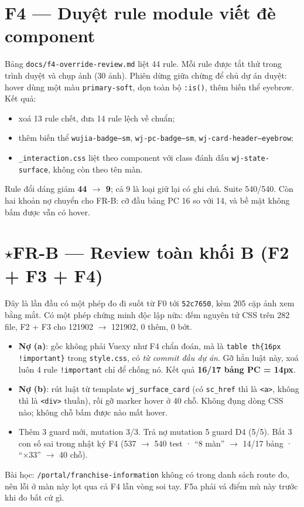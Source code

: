 \section{F4 --- Duyệt rule module viết đè component}

Bảng \texttt{docs/f4-override-review.md} liệt 44 rule. Mỗi rule được tắt thử trong trình duyệt và chụp
ảnh (30 ảnh). Phiên dừng giữa chừng để chủ dự án duyệt: hover dùng một màu \texttt{primary-soft}, dọn toàn
bộ \texttt{:is()}, thêm biến thể eyebrow. Kết quả:
\begin{itemize}[nosep]
\item xoá 13 rule chết, đưa 14 rule lệch về chuẩn;
\item thêm biến thể \texttt{wujia-badge--sm}, \texttt{wj-pc-badge--sm}, \texttt{wj-card-header--eyebrow};
\item \texttt{\_interaction.css} liệt theo component với class đánh dấu \texttt{wj-state-surface}, không còn theo tên màn.
\end{itemize}
Rule đổi dáng giảm \textbf{44 $\to$ 9}; cả 9 là loại giữ lại có ghi chú. Suite 540/540. Còn hai khoản nợ chuyển
cho FR-B: cỡ đầu bảng PC 16 so với 14, và bề mặt không bấm được vẫn có hover.

\section{$\star$FR-B --- Review toàn khối B (F2 + F3 + F4)}

Đây là lần đầu có một phép đo đi suốt từ F0 tới \texttt{52c7650}, kèm 205 cặp ảnh xem bằng mắt. Có một
phép chứng minh độc lập nữa: đếm nguyên tử CSS trên 282 file, F2 + F3 cho 121902 $\to$ 121902, 0 thêm, 0 bớt.
\begin{itemize}[nosep]
\item \textbf{Nợ (a)}: gốc không phải Vuexy như F4 chẩn đoán, mà là \texttt{table th\{16px !important\}} trong
  \texttt{style.css}, có \emph{từ commit đầu dự án}. Gỡ hẳn luật này, xoá luôn 4 rule \texttt{!important} chỉ để
  chống nó. Kết quả \textbf{16/17 bảng PC = 14px}.
\item \textbf{Nợ (b)}: rút luật từ template \texttt{wj\_surface\_card} (có \texttt{sc\_href} thì là \texttt{<a>}, không
  thì là \texttt{<div>} thuần), rồi gỡ marker hover ở 40 chỗ. Không đụng dòng CSS nào; không chỗ bấm được
  nào mất hover.
\item Thêm 3 guard mới, mutation 3/3. Trả nợ mutation 5 guard D4 (5/5). Bắt 3 con số sai trong nhật ký F4
  (537 $\to$ 540 test · ``8 màn'' $\to$ 14/17 bảng · ``×33'' $\to$ 40 chỗ).
\end{itemize}
Bài học: \texttt{/portal/franchise-information} không có trong danh sách route đo, nên lỗi ở màn này lọt qua cả
F4 lẫn vòng soi tay. F5a phải vá điểm mù này trước khi đo bất cứ gì.

